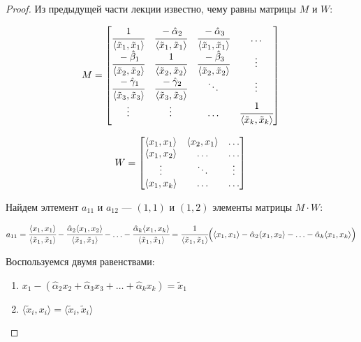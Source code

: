 \documentclass[12pt]{article} %
\theoremstyle{definition} %
\def \hb{\hat{\beta}}
\def \ha{\hat{\alpha}}
\def \hg{\hat{\gamma}}
\def \tx{\tilde{x}}
\begin{document}
\begin{proof} \hspace{1cm} \par

Из предыдущей части лекции известно, чему равны матрицы $M$ и $W$:

\[
    M =
    \begin{bmatrix}
       \cfrac{1}{\langle \tx_1,\tx_1 \rangle} &
       \cfrac{-\ha_2 }{\langle \tx_1,\tx_1 \rangle} &
       \cfrac{-\ha_3 }{\langle \tx_1,\tx_1 \rangle} & \ldots \\
     \cfrac{-\hb_1}{\langle \tx_2,\tx_2 \rangle} & \cfrac{1}{\langle \tx_2,\tx_2 \rangle} & \cfrac{-\hb_3}{\langle \tx_2,\tx_2 \rangle}  & \vdots \\
        \cfrac{-\hg_1}{\langle \tx_3,\tx_3 \rangle} & \cfrac{-\hg_2}{\langle \tx_3,\tx_3 \rangle} & \ddots & \vdots \\
        \vdots & \vdots & \ldots & \cfrac{1}{\langle \tx_k,\tx_k \rangle} \\
     \end{bmatrix} \\
 \]

 \[   
     W=
     \begin{bmatrix}
       \langle x_1, x_1 \rangle & \langle x_2, x_1 \rangle & \ldots \\
       \langle x_1, x_2 \rangle & \ldots & \ldots \\
       \vdots & \ddots & \vdots \\
       \langle x_1, x_k \rangle & \ldots & \ldots \\
     \end{bmatrix} \\
\]

Найдем элтемент $a_{11}$ и $a_{12}$  —  $(1,1)$ и $(1,2)$ элементы матрицы $ M \cdot W $:

\[  
    a_{11} = 
    \cfrac{\langle x_1, x_1 \rangle}{\langle\tx_1,\tx_1 \rangle} -
    \cfrac{\ha_2 \langle x_1, x_2 \rangle}{\langle\tx_1,\tx_1 \rangle} - \ldots 
     - \cfrac{\ha_k \langle x_1, x_k \rangle}{\langle\tx_1,\tx_1 \rangle}
    =\\
    \cfrac{1}{\langle\tx_1,\tx_1 \rangle} \Big ( \langle x_1, x_1 \rangle - \ha_2  \langle x_1, x_2 \rangle - \ldots 
    - \ha_k  \langle x_1, x_k \rangle   \Big )     
\]

Воспользуемся двумя равенствами:

\begin{enumerate}
    \item $x_1 - (\ha_2 x_2 + \ha_3 x_3 + \ldots + \ha_k x_k) = \tx_1$
    \item $\langle \tx_i, x_i \rangle = \langle \tx_i, \tx_i \rangle $
\end{enumerate}


\end{proof}
\end{document}
